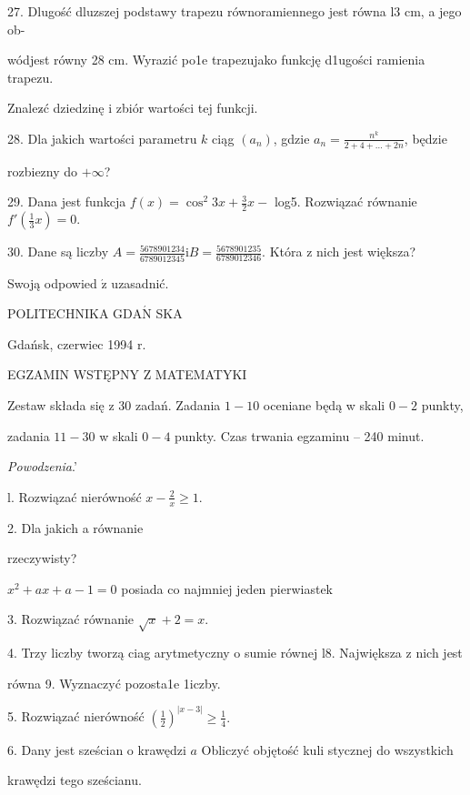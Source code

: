 \documentclass[a4paper,12pt]{article}
\begin{document}
27. Dlugość dluzszej podstawy trapezu równoramiennego jest równa l3 cm, a jego ob-

wódjest równy 28 cm. Wyrazić po1e trapezujako funkcję d1ugości ramienia trapezu.

Znalez$\acute{}$ć dziedzinę i zbiór wartości tej funkcji.

28. Dla jakich wartości parametru $k$ ciąg $(a_{n})$, gdzie $a_{n} = \displaystyle \frac{n^{k}}{2+4+\ldots+2n}$, będzie

rozbiezny do $+\infty$?

29. Dana jest funkcja $f(x)=\displaystyle \cos^{2}3x+\frac{3}{2}x-$ log5. Rozwiązać równanie $f'(\displaystyle \frac{1}{3}x)=0.$

30. Dane są liczby $A = \displaystyle \frac{5678901234}{6789012345} \mathrm{i} B = \displaystyle \frac{5678901235}{6789012346}$. Która z nich jest większa?

Swoją odpowied $\acute{\mathrm{z}}$ uzasadnić.







POLITECHNIKA $\mathrm{G}\mathrm{D}\mathrm{A}\acute{\mathrm{N}}$ SKA

Gdańsk, czerwiec 1994 r.

EGZAMIN WSTĘPNY Z MATEMATYKI

Zestaw składa się z 30 zadań. Zadania $1-10$ oceniane będą w skali $0-2$ punkty,

zadania $11-30$ w skali $0-4$ punkty. Czas trwania egzaminu -- 240 minut.

{\it Powodzenia}.'

l. Rozwiązać nierówność $x-\displaystyle \frac{2}{x}\geq 1.$

2. Dla jakich a równanie

rzeczywisty?

$x^{2}+ax+a-1=0$ posiada co najmniej jeden pierwiastek

3. Rozwiązać równanie $\sqrt{x}+2=x.$

4. Trzy liczby tworzą ciag arytmetyczny o sumie równej l8. Największa z nich jest

równa 9. Wyznaczyć pozosta1e 1iczby.

5. Rozwiązać nierówność $(\displaystyle \frac{1}{2})^{|x-3|}\geq\frac{1}{4}.$

6. Dany jest sześcian o krawędzi $a$ Obliczyć objętość kuli stycznej do wszystkich

krawędzi tego sześcianu.
\end{document}
